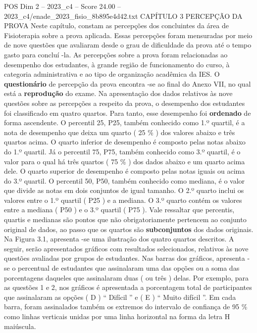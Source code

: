 \begin{textsample}{POS Dim 2 – 2023\_c4 – Score 24.00 – 2023\_c4/enade\_2023\_fisio\_8b895e4d42.txt}  \label{ex:f2_pos_003}
CAPÍTULO 3 PERCEPÇÃO DA PROVA Neste capítulo, constam as percepções dos concluintes da área de Fisioterapia sobre a prova aplicada.
Essas percepções foram mensuradas por meio de nove questões que avaliaram desde o grau de dificuldade da prova até o tempo gasto para concluí -la.
As percepções sobre a prova foram relacionadas ao desempenho dos estudantes, à grande região de funcionamento do curso, à categoria administrativa e ao tipo de organização acadêmica da IES.
O \textbf{questionário} de percepção da prova encontra -se ao final do Anexo VII, no qual está a \textbf{reprodução} do exame.
Na apresentação dos dados relativos às nove questões sobre as percepções a respeito da prova, o desempenho dos estudantes foi classificado em quatro quartos.
Para tanto, esse desempenho foi \textbf{ordenado} de forma ascendente.
O percentil 25, P25, também conhecido como 1.º quartil, é a nota de desempenho que deixa um quarto ( 25 \% ) dos valores abaixo e três quartos acima.
O quarto inferior de desempenho é composto pelas notas abaixo do 1.º quartil.
Já o percentil 75, P75, também conhecido como 3.º quartil, é o valor para o qual há três quartos ( 75 \% ) dos dados abaixo e um quarto acima dele.
O quarto superior de desempenho é composto pelas notas iguais ou acima do 3.º quartil.
O percentil 50, P50, também conhecido como mediana, é o valor que divide as notas em dois conjuntos de igual tamanho.
O 2.º quarto inclui os valores entre o 1.º quartil ( P25 ) e a mediana.
O 3.º quarto contém os valores entre a mediana ( P50 ) e o 3.º quartil ( P75 ).
Vale ressaltar que percentis, quartis e medianas são pontos que não obrigatoriamente pertencem ao conjunto original de dados, ao passo que os quartos são \textbf{subconjuntos} dos dados originais.
Na Figura 3.1, apresenta -se uma ilustração dos quatro quartos descritos.
A seguir, serão apresentados gráficos com resultados selecionados, relativos às nove questões avaliadas por grupos de estudantes.
Nas barras dos gráficos, apresenta -se o percentual de estudantes que assinalaram uma das opções ou a soma das porcentagens daqueles que assinalaram duas ( ou três ) delas.
Por exemplo, para as questões 1 e 2, nos gráficos é apresentada a porcentagem total de participantes que assinalaram as opções ( D ) “ Difícil ” e ( E ) “ Muito difícil ”.
Em cada barra, foram assinalados também os extremos do intervalo de confiança de 95 \% como linhas verticais unidas por uma linha horizontal na forma da letra H maiúscula.

\end{textsample}
